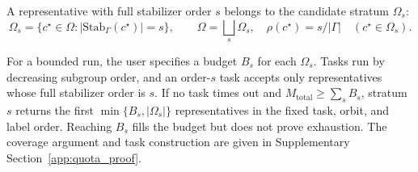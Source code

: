 \documentclass[a5paper, 10pt]{article}
\begin{document}
A representative with full stabilizer order $s$ belongs to the candidate stratum $\Omega_s$:%
\begin{equation}
\Omega_s=\{c^\star\in\Omega:|\mathrm{Stab}_{\Gamma}(c^\star)|=s\},
\qquad \Omega=\bigsqcup_s\Omega_s,\quad
\rho(c^\star)=s/|\Gamma|\quad(c^\star\in\Omega_s).
\label{eq:rho_strata}
\end{equation}

For a bounded run, the user specifies a budget $B_s$ for each $\Omega_s$. Tasks run by decreasing subgroup order, and an order-$s$ task accepts only representatives whose full stabilizer order is $s$. If no task times out and $M_{\mathrm{total}}\ge\sum_sB_s$, stratum $s$ returns the first $\min\{B_s,|\Omega_s|\}$ representatives in the fixed task, orbit, and label order. Reaching $B_s$ fills the budget but does not prove exhaustion. The coverage argument and task construction are given in Supplementary Section~\ref{app:quota_proof}.
\end{document}
